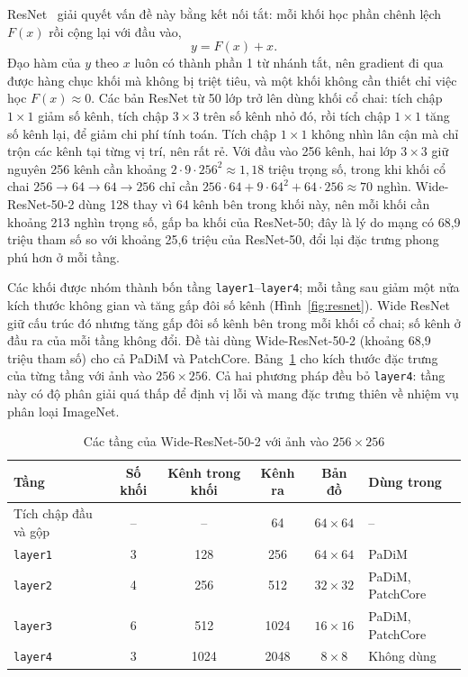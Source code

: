 ResNet~\cite{heDeepResidualLearning2016} giải quyết vấn đề này bằng kết nối tắt: mỗi khối học phần chênh lệch $F(x)$
rồi cộng lại với đầu vào,
\begin{equation}
  y = F(x) + x .
  \label{eq:residual}
\end{equation}
Đạo hàm của $y$ theo $x$ luôn có thành phần 1 từ nhánh tắt, nên gradient đi qua được hàng chục khối mà không bị triệt
tiêu, và một khối không cần thiết chỉ việc học $F(x) \approx 0$. Các bản ResNet từ 50 lớp trở lên dùng khối cổ chai:
tích chập $1\times1$ giảm số kênh, tích chập $3\times3$ trên số kênh nhỏ đó, rồi tích chập $1\times1$ tăng số kênh lại,
để giảm chi phí tính toán. Tích chập $1\times1$ không nhìn lân cận mà chỉ trộn các kênh tại từng vị trí, nên rất rẻ.
Với đầu vào 256 kênh, hai lớp $3\times3$ giữ nguyên 256 kênh cần khoảng $2 \cdot 9 \cdot 256^2 \approx 1{,}18$ triệu
trọng số, trong khi khối cổ chai $256 \to 64 \to 64 \to 256$ chỉ cần $256 \cdot 64 + 9 \cdot 64^2 + 64 \cdot 256
\approx 70$ nghìn. Wide-ResNet-50-2 dùng 128 thay vì 64 kênh bên trong khối này, nên mỗi khối cần khoảng 213 nghìn
trọng số, gấp ba khối của ResNet-50; đây là lý do mạng có 68,9 triệu tham số so với khoảng 25,6 triệu của ResNet-50,
đổi lại đặc trưng phong phú hơn ở mỗi tầng.

Các khối được nhóm thành bốn tầng \texttt{layer1}--\texttt{layer4}; mỗi tầng sau giảm một nửa kích thước không gian
và tăng gấp đôi số kênh (Hình~\ref{fig:resnet}). Wide ResNet~\cite{zagoruykoWideResidualNetworks2016} giữ cấu trúc đó
nhưng tăng gấp đôi số kênh bên trong mỗi khối cổ chai; số kênh ở đầu ra của mỗi tầng không đổi. Đề tài dùng
Wide-ResNet-50-2 (khoảng 68,9 triệu tham số) cho cả PaDiM và PatchCore. Bảng~\ref{tab:wrn} cho kích thước đặc trưng
của từng tầng với ảnh vào $256\times256$. Cả hai phương pháp đều bỏ \texttt{layer4}: tầng này có độ phân giải quá thấp
để định vị lỗi và mang đặc trưng thiên về nhiệm vụ phân loại ImageNet.

\begin{table}[htbp]
  \centering
  \caption{Các tầng của Wide-ResNet-50-2 với ảnh vào $256\times256$}
  \label{tab:wrn}
  \small
  \begin{tabular}{@{}l c c c c l@{}}
    \toprule
    Tầng & Số khối & Kênh trong khối & Kênh ra & Bản đồ & Dùng trong \\
    \midrule
    Tích chập đầu và gộp & -- & -- & 64 & $64\times64$ & -- \\
    \texttt{layer1} & 3 & 128  & 256  & $64\times64$ & PaDiM \\
    \texttt{layer2} & 4 & 256  & 512  & $32\times32$ & PaDiM, PatchCore \\
    \texttt{layer3} & 6 & 512  & 1024 & $16\times16$ & PaDiM, PatchCore \\
    \texttt{layer4} & 3 & 1024 & 2048 & $8\times8$   & Không dùng \\
    \bottomrule
  \end{tabular}
\end{table}

